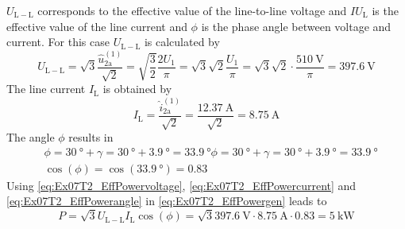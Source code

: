 \begin{solutionblock}
    $U_{\mathrm{L-L}}$ corresponds to the effective value of the line-to-line voltage and $IU_{\mathrm{L}}$ is the effective value
    of the line current and $\phi$ is the phase angle between voltage and current. For this case $U_{\mathrm{L-L}}$ is calculated by
    \begin{equation}
        U_{\mathrm{L-L}}=\sqrt{3}\frac{\hat{u}_\mathrm{2a}^\mathrm{(1)}}{\sqrt{2}}
        = \sqrt{\frac{3}{2}} \frac{2U_\mathrm{1}}{\pi} = \sqrt{3}\sqrt{2}\frac{U_\mathrm{1}}{\pi}
        = \sqrt{3}\sqrt{2} \cdot \frac{\SI{510}{\volt}}{\pi}=\SI{397.6}{\volt}
        \label{eq:Ex07T2_EffPowervoltage}
    \end{equation}
    The line current $I_{\mathrm{L}}$ is obtained by
    \begin{equation}
        I_{\mathrm{L}}=\frac{\hat{i}_\mathrm{2a}^\mathrm{(1)}}{\sqrt{2}}
        = \frac{\SI{12.37}{\ampere}}{\sqrt{2}}=\SI{8.75}{\ampere}
        \label{eq:Ex07T2_EffPowercurrent}
    \end{equation}    
    The angle $\phi$ results in
    \begin{equation}
        \begin{split}        
            &\phi=\SI{30}{\degree}+ \gamma= \SI{30}{\degree}+\SI{3.9}{\degree}= \SI{33.9}{\degree}\phi=\SI{30}{\degree}+ \gamma= \SI{30}{\degree}+\SI{3.9}{\degree}= \SI{33.9}{\degree} \\
            &\cos(\phi)=\cos(\SI{33.9}{\degree})=0.83
        \end{split}          
        \label{eq:Ex07T2_EffPowerangle}
    \end{equation}
    Using \eqref{eq:Ex07T2_EffPowervoltage},  \eqref{eq:Ex07T2_EffPowercurrent} and  \eqref{eq:Ex07T2_EffPowerangle}
    in \eqref{eq:Ex07T2_EffPowergen} leads to
    \begin{equation}
        P=\sqrt{3} U_{\mathrm{L-L}} I_{\mathrm{L}} \cos(\phi)
        = \sqrt{3} \SI{397.6}{\volt} \cdot \SI{8.75}{\ampere} \cdot 0.83= \SI{5}{\kilo\watt}
    \end{equation}
\end{solutionblock}